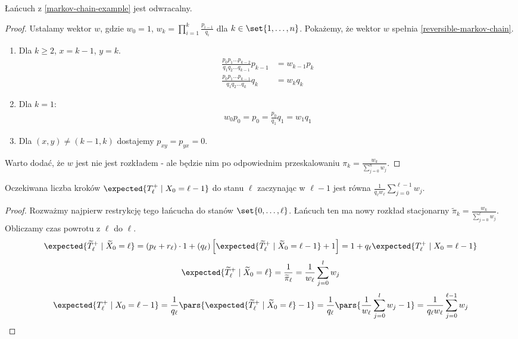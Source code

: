 \begin{lemma}
	Łańcuch z \ref{markov-chain-example} jest odwracalny.
\end{lemma}
\begin{proof}
	Ustalamy wektor \(w\), gdzie \(w_0 = 1\), \(w_k = \prod_{i=1}^k \frac{p_{i-1}}{q_i}\) dla \(k \in \set{1, \dots, n}\).
	Pokażemy, że wektor \(w\) spełnia \ref{reversible-markov-chain}.

	\begin{enumerate}
		\item Dla \(k \geq 2\), \(x = k-1\), \(y = k\).
		\begin{align*}
			\frac{p_0p_1\dots p_{k-2}}{q_1q_2\dots q_{k-1}}p_{k-1} &= w_{k-1}p_k\\
			\frac{p_0p_1\dots p_{k-1}}{q_1q_2\dots q_k}q_k &= w_kq_k
		\end{align*}
		\item Dla \(k = 1\):
		\begin{align*}
			w_0p_0 = p_0 = \frac{p_0}{q_1}q_1 = w_1q_1
		\end{align*}
		\item Dla \((x,y) \neq (k-1, k)\) dostajemy \(p_{xy} = p_{yx} = 0\).
	\end{enumerate}

	Warto dodać, że \(w\) jest nie jest rozkładem - ale będzie nim po odpowiednim przeskalowaniu \(\pi_k = \frac{w_k}{\sum_{j=0}^n w_j}\).
\end{proof}

\begin{theorem}
	Oczekiwana liczba kroków \(\expected{T^+_\ell \mid X_0 = \ell - 1}\) do stanu \(\ell\) zaczynając w \(\ell - 1\) jest równa \(\frac{1}{q_\ell w_\ell}\sum_{j=0}^{\ell-1}w_j\).
\end{theorem}
\begin{proof}
	Rozważmy najpierw restrykcję tego łańcucha do stanów \(\set{0, \dots, \ell}\). Łańcuch ten ma nowy rozkład stacjonarny \(\widetilde{\pi}_k = \frac{w_k}{\sum_{j=0}^\ell w_j}\).
	Obliczamy czas powrotu z \(\ell\) do \(\ell\).
	\[
		\expected{\widetilde{T}^+_\ell \mid \widetilde{X}_0 = \ell} = (p_\ell + r_\ell) \cdot 1 + (q_\ell)\left[\expected{\widetilde{T}^+_\ell \mid \widetilde{X}_0 = \ell-1} + 1\right] = 1 + q_\ell \expected{T_\ell^+ \mid X_0 = \ell - 1}
	\]
	\[
		\expected{\widetilde{T}^+_\ell \mid \widetilde{X}_0 = \ell} = \frac{1}{\widetilde{\pi}_\ell} = \frac{1}{w_\ell}\sum_{j=0}^l w_j
	\]
	\[
		\expected{T_\ell^+ \mid X_0 = \ell - 1} = \frac{1}{q_\ell}\pars{\expected{\widetilde{T}^+_\ell \mid \widetilde{X}_0 = \ell} - 1} = \frac{1}{q_\ell}\pars{\frac{1}{w_\ell}\sum_{j=0}^l w_j - 1} = \frac{1}{q_\ell w_\ell}\sum_{j=0}^{\ell-1}w_j
	\]
\end{proof}

